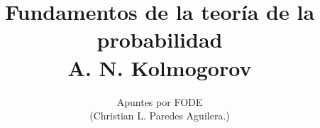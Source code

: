 \normalfont

\author{\Large Apuntes por FODE \\ \small (Christian L. Paredes Aguilera.)}
\title{Fundamentos de la teoría de la probabilidad \\ \small A. N. Kolmogorov}
\date{}
\pagestyle{empty}
\maketitle
\thispagestyle{empty}
\let\cleardoublepage\clearpage
\tableofcontents								%


 
\let\cleardoublepage\clearpage
